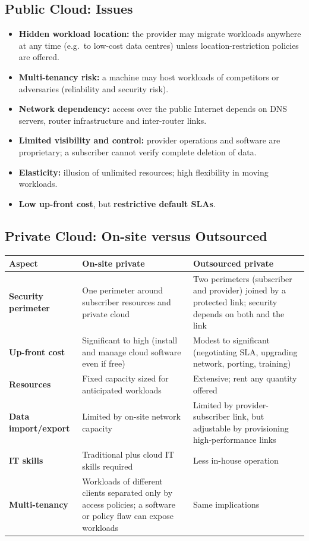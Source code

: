 \documentclass[11pt,a4paper,openany]{report}
\begin{document}
\subsection{Public Cloud: Issues}
\begin{itemize}[leftmargin=*]
  \item \textbf{Hidden workload location:} the provider may migrate workloads anywhere at any time
        (e.g.\ to low-cost data centres) unless location-restriction policies are offered.
  \item \textbf{Multi-tenancy risk:} a machine may host workloads of competitors or adversaries
        (reliability and security risk).
  \item \textbf{Network dependency:} access over the public Internet depends on DNS servers, router
        infrastructure and inter-router links.
  \item \textbf{Limited visibility and control:} provider operations and software are proprietary; a
        subscriber cannot verify complete deletion of data.
  \item \textbf{Elasticity:} illusion of unlimited resources; high flexibility in moving workloads.
  \item \textbf{Low up-front cost}, but \textbf{restrictive default SLAs}.
\end{itemize}

\subsection{Private Cloud: On-site versus Outsourced}
\begin{center}
\begin{tabularx}{\textwidth}{>{\bfseries}lXX}
\toprule
Aspect & On-site private & Outsourced private\\
\midrule
Security perimeter & One perimeter around subscriber resources and private cloud & Two perimeters
(subscriber and provider) joined by a protected link; security depends on both and the link\\
Up-front cost & Significant to high (install and manage cloud software even if free) & Modest to
significant (negotiating SLA, upgrading network, porting, training)\\
Resources & Fixed capacity sized for anticipated workloads & Extensive; rent any quantity offered\\
Data import/export & Limited by on-site network capacity & Limited by provider-subscriber link, but
adjustable by provisioning high-performance links\\
IT skills & Traditional plus cloud IT skills required & Less in-house operation\\
Multi-tenancy & Workloads of different clients separated only by access policies; a software or policy
flaw can expose workloads & Same implications\\
\bottomrule
\end{tabularx}
\end{center}
\end{document}
